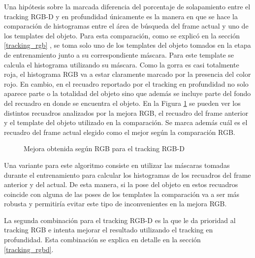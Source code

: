 Una hipótesis sobre la marcada diferencia del porcentaje de solapamiento entre el tracking RGB-D y en profundidad únicamente es la manera en que se hace la comparación de histogramas entre el área de búsqueda del frame actual y uno de los templates del objeto.  Para esta comparación, como se explicó en la sección \ref{tracking_rgb} , se toma solo uno de los templates del objeto tomados en la etapa de entrenamiento junto a su correspondiente máscara. Para este template se calcula el histograma utilizando su máscara. Como la gorra es casi totalmente roja, el histograma RGB va a estar claramente marcado por la presencia del color rojo. En cambio, en el recuadro reportado por el tracking en profundidad no solo aparece parte o la totalidad del objeto sino que además se incluye parte del fondo del recuadro en donde se encuentra el objeto. En la Figura \ref{mejora_rgb_en_tracking_rgbd} se pueden ver los distintos recuadros analizados por la mejora RGB, el recuadro del frame anterior y el template del objeto utilizado en la comparación. Se marca además cuál es el recuadro del frame actual elegido como el mejor según la comparación RGB. 

\begin{figure}
	\caption{Mejora obtenida según RGB para el tracking RGB-D}
	\label{mejora_rgb_en_tracking_rgbd}
\end{figure}

Una variante para este algoritmo consiste en utilizar las máscaras tomadas durante el entrenamiento para calcular los histogramas de los recuadros del frame anterior y del actual. De esta manera, si la pose del objeto en estos recuadros coincide con alguna de las poses de los templates la comparación va a ser más robusta y permitiría evitar este tipo de inconvenientes en la mejora RGB.

La segunda combinación para el tracking RGB-D es la que le da prioridad al tracking RGB e intenta mejorar el resultado utilizando el tracking en profundidad. Esta combinación se explica en detalle en la sección \ref{tracking_rgbd}.

